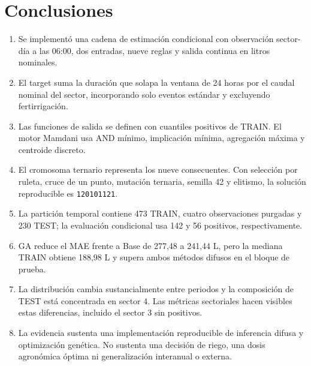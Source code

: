 \documentclass[11pt,letterpaper]{article}
\newcommand{\codigo}[1]{\texttt{\small #1}}
\begin{document}
\section{Conclusiones}
\begin{enumerate}
  \item Se implementó una cadena de estimación condicional con observación sector-día a las 06:00, dos entradas, nueve reglas y salida continua en litros nominales.
  \item El target suma la duración que solapa la ventana de 24 horas por el caudal nominal del sector, incorporando solo eventos estándar y excluyendo fertirrigación.
  \item Las funciones de salida se definen con cuantiles positivos de TRAIN. El motor Mamdani usa AND mínimo, implicación mínima, agregación máxima y centroide discreto.
  \item El cromosoma ternario representa los nueve consecuentes. Con selección por ruleta, cruce de un punto, mutación ternaria, semilla 42 y elitismo, la solución reproducible es \codigo{120101121}.
  \item La partición temporal contiene 473 TRAIN, cuatro observaciones purgadas y 230 TEST; la evaluación condicional usa 142 y 56 positivos, respectivamente.
  \item GA reduce el MAE frente a Base de 277,48 a 241,44 L, pero la mediana TRAIN obtiene 188,98 L y supera ambos métodos difusos en el bloque de prueba.
  \item La distribución cambia sustancialmente entre periodos y la composición de TEST está concentrada en sector 4. Las métricas sectoriales hacen visibles estas diferencias, incluido el sector 3 sin positivos.
  \item La evidencia sustenta una implementación reproducible de inferencia difusa y optimización genética. No sustenta una decisión de riego, una dosis agronómica óptima ni generalización interanual o externa.
\end{enumerate}
\end{document}
